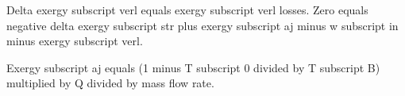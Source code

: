 Delta exergy subscript verl equals exergy subscript verl losses.  
Zero equals negative delta exergy subscript str plus exergy subscript aj minus w subscript in minus exergy subscript verl.  

Exergy subscript aj equals (1 minus T subscript 0 divided by T subscript B) multiplied by Q divided by mass flow rate.